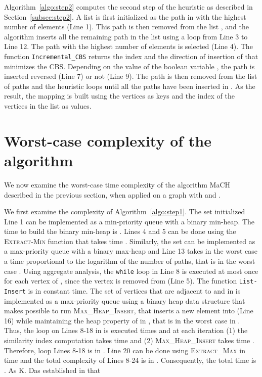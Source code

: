 \documentclass{scrartcl}
\theoremstyle{plain}
\newcommand{\algo}{MaCH}
\newcommand{\cbs}{CBS}
\begin{document}
Algorithm~\ref{algo:step2} computes the second step of the heuristic as 
described in Section~\ref{subsec:step2}. A list  is first initialized as 
the path in  with the highest number of elements (Line 1). This path is 
then removed from the list , and the algorithm inserts all the remaining 
path in the list  using a loop from Line 3 to Line 12. The path with the 
highest number of elements is selected (Line 4). The function 
\texttt{Incremental\_CBS} returns the index and the direction of insertion of 
 that minimizes the \cbs{}. Depending on the value of the boolean variable 
, the path  is inserted reversed (Line 7) or not (Line 9). The 
path is then removed from the list of paths  and the heuristic loops 
until all the paths have been inserted in . As the result, the mapping 
 is built using the vertices as keys and the index of the vertices in the 
list  as values.
 
\makeatletter{}\section{Worst-case complexity of the algorithm}
\label{sec:complexity}

We now examine the worst-case time complexity of the algorithm \algo{} described 
in the previous section, when applied on a graph  with  and . 

We first examine the complexity of Algorithm~\ref{algo:step1}. The set  
initialized Line 1 can be implemented as a min-priority queue with a binary 
min-heap. The time to build the binary min-heap is . Lines 4 and 5 can be 
done using the \textsc{Extract-Min} function that takes time . 
Similarly, the set  can be implemented as a max-priority queue with a 
binary max-heap and Line 13 takes in the worst case a time proportional to the 
logarithm of the number of paths, that is in the worst case . Using 
aggregate analysis, the \texttt{while} loop in Line 8 is executed at most once 
for each vertex of , since the vertex  is removed from  (Line 5). The 
function \texttt{List-Insert} is in constant time. The set  of vertices that 
are adjacent to  and in  is implemented as a max-priority queue using a 
binary heap data structure that makes possible to run 
\textsc{Max\_Heap\_Insert}, that inserts a new element into  (Line 16) while 
maintaining the heap property of  in , that is in the worst 
case in . Thus, the loop on Lines 8-18 in is 
executed  times and at each iteration (1) the similarity 
index computation takes time  
and (2) \textsc{Max\_Heap\_Insert} takes time . 
Therefore, loop Lines 8-18 is in . Line 20 can be done 
using \textsc{Extract\_Max} in time  and the total 
complexity of Lines 8-24 is in . Consequently, the total 
time is . As K. Das established in 
\cite{Das2003} that 
\end{document}
